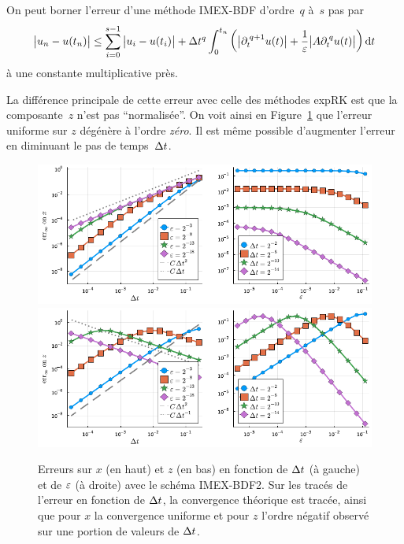 \begin{FRtheorem*}
    On peut borner l'erreur d'une méthode IMEX-BDF d'ordre~$q$ à~$s$ pas par
    \begin{equation*}
        \big| u_n - u(t_n) \big| \leq
        \sum_{i = 0}^{s-1} \big| u_i - u(t_i) \big|
        + \Delta t^q \int_0^{t_n} \left( 
            \big| \partial_t^{\: q+1} u(t) \big| 
            + \frac{1}{\varepsilon} \big| A \partial_t^{\: q} u(t) \big| 
        \right) \mathrm{d} t 
    \end{equation*}
    à une constante multiplicative près.
\end{FRtheorem*}

La différence principale de cette erreur avec celle des méthodes expRK est que la composante~$z$ n'est pas \enquote{normalisée}. On voit ainsi en Figure~\ref{sec:intro:fig:bdf2} que l'erreur uniforme sur $z$ dégénère à l'ordre \textit{zéro}. Il est même possible d'augmenter l'erreur en diminuant le pas de temps~$\Delta t$. 

\begin{figure}
    \centering
    \includegraphics[width=\textwidth]{./Presentation/bdf2_err_x.pdf}
    \includegraphics[width=\textwidth]{./Presentation/bdf2_err_z.pdf}
    \caption{Erreurs sur $x$ (en haut) et $z$ (en bas) en fonction de $\Delta t$ (à gauche) et de $\varepsilon$ (à droite) avec le schéma IMEX-BDF2. Sur les tracés de l'erreur en fonction de $\Delta t$, la convergence théorique est tracée, ainsi que pour $x$ la convergence uniforme et pour $z$ l'ordre négatif observé sur une portion de valeurs de $\Delta t$.}
    \label{sec:intro:fig:bdf2}
\end{figure}

